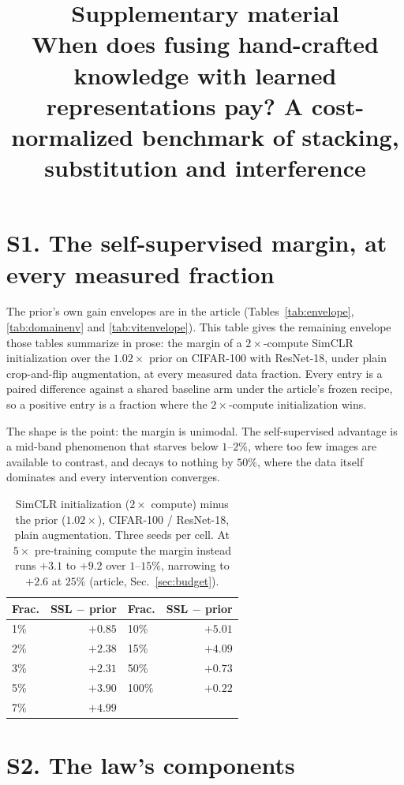 \documentclass[11pt]{article}
\title{Supplementary material\\
\large When does fusing hand-crafted knowledge with learned representations
pay? A cost-normalized benchmark of stacking, substitution and interference}
\date{}
\begin{document}
\maketitle

\section*{S1. The self-supervised margin, at every measured fraction}

The prior's own gain envelopes are in the article (Tables~\ref{tab:envelope},
\ref{tab:domainenv} and \ref{tab:vitenvelope}). This
table gives the remaining envelope those tables summarize in prose: the margin
of a $2\times$-compute SimCLR initialization over the $1.02\times$ prior on
CIFAR-100 with ResNet-18, under plain crop-and-flip augmentation, at every
measured data fraction. Every entry is a paired difference against a shared
baseline arm under the article's frozen recipe, so a positive entry is a
fraction where the $2\times$-compute initialization wins.

The shape is the point: the margin is unimodal. The self-supervised
advantage is a mid-band phenomenon that starves below $1$--$2\%$, where too
few images are available to contrast, and decays to nothing by $50\%$, where
the data itself dominates and every intervention converges.

\begin{table}[htbp]
\centering
\caption{SimCLR initialization ($2\times$ compute) minus the prior
($1.02\times$), CIFAR-100 / ResNet-18, plain augmentation. Three seeds per
cell. At $5\times$ pre-training compute the margin instead runs $+3.1$ to
$+9.2$ over $1$--$15\%$, narrowing to $+2.6$ at $25\%$ (article,
Sec.~\ref{sec:budget}).}
\label{tab:appssl}
\begin{tabular}{lrlr}
\toprule
Frac. & SSL $-$ prior & Frac. & SSL $-$ prior \\
\midrule
1\% & $+0.85$ & 10\%  & $+5.01$ \\
2\% & $+2.38$ & 15\%  & $+4.09$ \\
3\% & $+2.31$ & 50\%  & $+0.73$ \\
5\% & $+3.90$ & 100\% & $+0.22$ \\
7\% & $+4.99$ &       & \\
\bottomrule
\end{tabular}
\end{table}

\section*{S2. The law's components}
\end{document}
